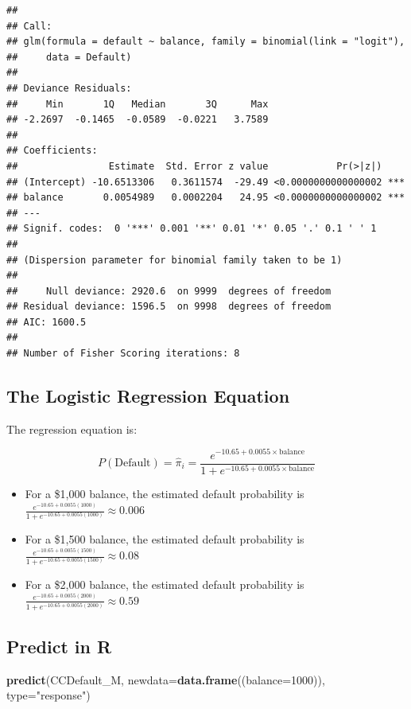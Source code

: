 \documentclass[]{book}
\newenvironment{Shaded}{\begin{snugshade}}{\end{snugshade}}
\newcommand{\KeywordTok}[1]{\textcolor[rgb]{0.13,0.29,0.53}{\textbf{#1}}}
\newcommand{\DataTypeTok}[1]{\textcolor[rgb]{0.13,0.29,0.53}{#1}}
\newcommand{\DecValTok}[1]{\textcolor[rgb]{0.00,0.00,0.81}{#1}}
\newcommand{\StringTok}[1]{\textcolor[rgb]{0.31,0.60,0.02}{#1}}
\newcommand{\NormalTok}[1]{#1}
\begin{document}
\begin{verbatim}
## 
## Call:
## glm(formula = default ~ balance, family = binomial(link = "logit"), 
##     data = Default)
## 
## Deviance Residuals: 
##     Min       1Q   Median       3Q      Max  
## -2.2697  -0.1465  -0.0589  -0.0221   3.7589  
## 
## Coefficients:
##                Estimate  Std. Error z value            Pr(>|z|)    
## (Intercept) -10.6513306   0.3611574  -29.49 <0.0000000000000002 ***
## balance       0.0054989   0.0002204   24.95 <0.0000000000000002 ***
## ---
## Signif. codes:  0 '***' 0.001 '**' 0.01 '*' 0.05 '.' 0.1 ' ' 1
## 
## (Dispersion parameter for binomial family taken to be 1)
## 
##     Null deviance: 2920.6  on 9999  degrees of freedom
## Residual deviance: 1596.5  on 9998  degrees of freedom
## AIC: 1600.5
## 
## Number of Fisher Scoring iterations: 8
\end{verbatim}

\subsection{The Logistic Regression
Equation}\label{the-logistic-regression-equation}

The regression equation is:

\[
P(\text{Default}) = \hat{\pi}_i =  \frac{e^{-10.65+0.0055\times\text{balance}}}{1+e^{-10.65+0.0055\times\text{balance}}}
\]

\begin{itemize}
\item
  For a \$1,000 balance, the estimated default probability is
  \(\frac{e^{-10.65+0.0055(1000) }}{1+e^{-10.65+0.0055(1000)}} \approx 0.006\)
\item
  For a \$1,500 balance, the estimated default probability is
  \(\frac{e^{-10.65+0.0055(1500) }}{1+e^{-10.65+0.0055(1500)}} \approx 0.08\)
\item
  For a \$2,000 balance, the estimated default probability is
  \(\frac{e^{-10.65+0.0055(2000) }}{1+e^{-10.65+0.0055(2000)}} \approx 0.59\)
\end{itemize}

\subsection{Predict in R}\label{predict-in-r}

\begin{Shaded}
\begin{Highlighting}[]
\KeywordTok{predict}\NormalTok{(CCDefault_M, }\DataTypeTok{newdata=}\KeywordTok{data.frame}\NormalTok{((}\DataTypeTok{balance=}\DecValTok{1000}\NormalTok{)), }\DataTypeTok{type=}\StringTok{"response"}\NormalTok{)}
\end{Highlighting}
\end{Shaded}
\end{document}
